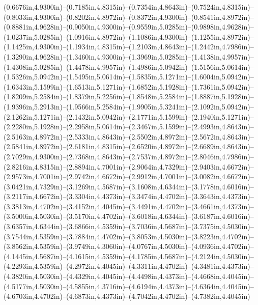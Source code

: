 (0.6676in,4.9300in)--(0.7185in,4.8315in)--(0.7354in,4.8643in)--(0.7524in,4.8315in)--(0.8033in,4.9300in)--(0.8202in,4.8972in)--(0.8372in,4.9300in)--(0.8541in,4.8972in)--(0.8881in,4.9628in)--(0.9050in,4.9300in)--(0.9559in,5.0285in)--(0.9898in,4.9628in)--(1.0237in,5.0285in)--(1.0916in,4.8972in)--(1.1086in,4.9300in)--(1.1255in,4.8972in)--(1.1425in,4.9300in)--(1.1934in,4.8315in)--(1.2103in,4.8643in)--(1.2442in,4.7986in)--(1.3290in,4.9628in)--(1.3460in,4.9300in)--(1.3969in,5.0285in)--(1.4138in,4.9957in)--(1.4308in,5.0285in)--(1.4478in,4.9957in)--(1.4986in,5.0942in)--(1.5156in,5.0614in)--(1.5326in,5.0942in)--(1.5495in,5.0614in)--(1.5835in,5.1271in)--(1.6004in,5.0942in)--(1.6343in,5.1599in)--(1.6513in,5.1271in)--(1.6852in,5.1928in)--(1.7361in,5.0942in)--(1.8209in,5.2584in)--(1.8379in,5.2256in)--(1.8548in,5.2584in)--(1.8887in,5.1928in)--(1.9396in,5.2913in)--(1.9566in,5.2584in)--(1.9905in,5.3241in)--(2.1092in,5.0942in)--(2.1262in,5.1271in)--(2.1432in,5.0942in)--(2.1771in,5.1599in)--(2.1940in,5.1271in)--(2.2280in,5.1928in)--(2.2958in,5.0614in)--(2.3467in,5.1599in)--(2.4993in,4.8643in)--(2.5163in,4.8972in)--(2.5333in,4.8643in)--(2.5502in,4.8972in)--(2.5672in,4.8643in)--(2.5841in,4.8972in)--(2.6181in,4.8315in)--(2.6520in,4.8972in)--(2.6689in,4.8643in)--(2.7029in,4.9300in)--(2.7368in,4.8643in)--(2.7537in,4.8972in)--(2.8046in,4.7986in)--(2.8216in,4.8315in)--(2.8894in,4.7001in)--(2.9064in,4.7329in)--(2.9403in,4.6672in)--(2.9573in,4.7001in)--(2.9742in,4.6672in)--(2.9912in,4.7001in)--(3.0082in,4.6672in)--(3.0421in,4.7329in)--(3.1269in,4.5687in)--(3.1608in,4.6344in)--(3.1778in,4.6016in)--(3.2117in,4.6672in)--(3.3304in,4.4373in)--(3.3474in,4.4702in)--(3.3643in,4.4373in)--(3.3813in,4.4702in)--(3.4152in,4.4045in)--(3.4491in,4.4702in)--(3.4661in,4.4373in)--(3.5000in,4.5030in)--(3.5170in,4.4702in)--(3.6018in,4.6344in)--(3.6187in,4.6016in)--(3.6357in,4.6344in)--(3.6866in,4.5359in)--(3.7036in,4.5687in)--(3.7375in,4.5030in)--(3.7544in,4.5359in)--(3.7884in,4.4702in)--(3.8053in,4.5030in)--(3.8223in,4.4702in)--(3.8562in,4.5359in)--(3.9749in,4.3060in)--(4.0767in,4.5030in)--(4.0936in,4.4702in)--(4.1445in,4.5687in)--(4.1615in,4.5359in)--(4.1785in,4.5687in)--(4.2124in,4.5030in)--(4.2293in,4.5359in)--(4.2972in,4.4045in)--(4.3311in,4.4702in)--(4.3481in,4.4373in)--(4.3820in,4.5030in)--(4.4329in,4.4045in)--(4.4498in,4.4373in)--(4.4668in,4.4045in)--(4.5177in,4.5030in)--(4.5855in,4.3716in)--(4.6194in,4.4373in)--(4.6364in,4.4045in)--(4.6703in,4.4702in)--(4.6873in,4.4373in)--(4.7042in,4.4702in)--(4.7382in,4.4045in)
